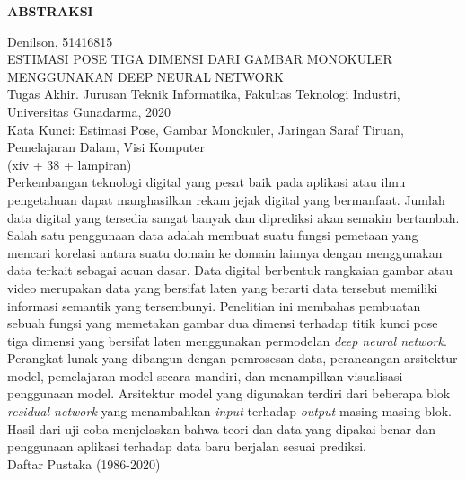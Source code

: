 \newpage %
\begin{center}
    \begin{large}\textbf{ABSTRAKSI}\end{large}
\end{center}

\vspace{5mm}

\noindent Denilson, 51416815 \\
ESTIMASI POSE TIGA DIMENSI DARI GAMBAR MONOKULER MENGGUNAKAN DEEP NEURAL NETWORK\\
Tugas Akhir. Jurusan Teknik Informatika, Fakultas Teknologi Industri, \\
Universitas Gunadarma, 2020\\
Kata Kunci: Estimasi Pose, Gambar Monokuler, Jaringan Saraf Tiruan, Pemelajaran Dalam, Visi Komputer\\
\noindent (xiv + 38 + lampiran)\\

Perkembangan teknologi digital yang pesat baik pada aplikasi atau ilmu pengetahuan dapat
manghasilkan rekam jejak digital yang bermanfaat. Jumlah data digital yang tersedia sangat
banyak dan diprediksi akan semakin bertambah. Salah satu penggunaan data adalah membuat
suatu fungsi pemetaan yang mencari korelasi antara suatu domain ke domain lainnya dengan
menggunakan data terkait sebagai acuan dasar. Data digital berbentuk rangkaian gambar atau video
merupakan data yang bersifat laten yang berarti data tersebut memiliki informasi semantik yang
tersembunyi. Penelitian ini membahas pembuatan sebuah fungsi yang memetakan gambar dua dimensi
terhadap titik kunci pose tiga dimensi yang bersifat laten menggunakan permodelan
\textit{deep neural network}. Perangkat lunak yang dibangun dengan pemrosesan data,
perancangan arsitektur model, pemelajaran model secara mandiri, dan menampilkan visualisasi
penggunaan model. Arsitektur model yang digunakan terdiri dari beberapa blok \textit{residual network}
yang menambahkan \textit{input} terhadap \textit{output} masing-masing blok. Hasil dari uji coba menjelaskan
bahwa teori dan data yang dipakai benar dan penggunaan aplikasi terhadap data baru berjalan
sesuai prediksi.\\


\noindent Daftar Pustaka (1986-2020)
